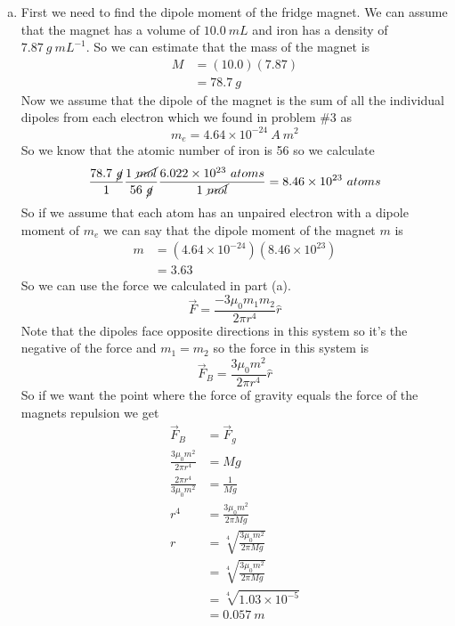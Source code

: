 \documentclass[11pt]{article}
\numberwithin{equation}{section}
\begin{document}
\begin{enumerate}[(a)]
\item
First we need to find the dipole moment of the fridge magnet. We can assume that the magnet has a volume of $10.0\ mL$ and iron has a density of $7.87\ g\ mL^{-1}$. So we can estimate that the mass of the magnet is 
\begin{align*}
M &= (10.0)(7.87)\\
&= 78.7\ g
\end{align*}
Now we assume that the dipole of the magnet is the sum of all the individual dipoles from each electron which we found in problem \#3 as
$$m_e = 4.64\times10^{-24}\ A\ m^2$$
So we know that the atomic number of iron is 56 so we calculate
$$\frac{78.7\ \cancel{g}}{1}\frac{1\ \cancel{mol}}{56\ \cancel{g}}\frac{6.022\times10^{23}\ atoms}{1\ \cancel{mol}} = 8.46\times10^{23}\ atoms$$
So if we assume that each atom has an unpaired electron with a dipole moment of $m_e$ we can say that the dipole moment of the magnet $m$ is
\begin{align*}
m &= (4.64\times10^{-24})(8.46\times10^{23})\\
&= 3.63
\end{align*}
So we can use the force we calculated in part (a). 
$$\vec{F} = \frac{-3\mu_0 m_1m_2}{2\pi r^4}\hat{r}$$
Note that the dipoles face opposite directions in this system so it's the negative of the force and $m_1=m_2$ so the force in this system is
$$\vec{F}_B = \frac{3\mu_0 m^2}{2\pi r^4}\hat{r}$$
So if we want the point where the force of gravity equals the force of the magnets repulsion we get
\begin{align*}
\vec{F}_B &= \vec{F}_g \\ 
\frac{3\mu_0 m^2}{2\pi r^4} &= Mg \\ 
\frac{2\pi r^4}{3\mu_0 m^2} &=\frac{1}{Mg} \\ 
r^4 &=\frac{3\mu_0 m^2}{2\pi Mg} \\ 
r &=\sqrt[4]{\frac{3\mu_0 m^2}{2\pi Mg}} \\ 
&=\sqrt[4]{\frac{3\mu_0 m^2}{2\pi Mg}} \\ 
&=\sqrt[4]{1.03\times10^{-5}} \\ 
&=0.057\ m
\end{align*}

\end{enumerate}
\end{document}
